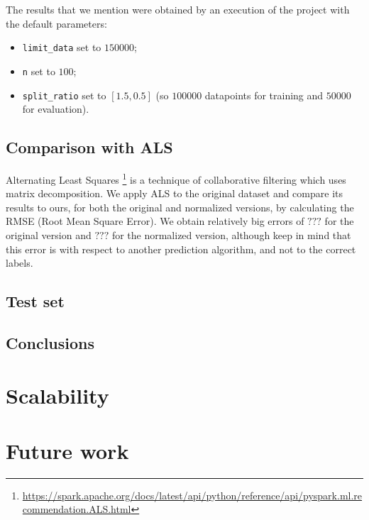 \documentclass[11pt,a4paper]{article}
\newcommand{\code}{\texttt}
\begin{document}
\begin{multicols}{2}
The results that we mention were obtained by an execution of the project with the default parameters:
\begin{itemize}
	\item \code{limit\_data} set to $150 000$;
	\item \code{n} set to $100$;
	\item \code{split\_ratio} set to $[1.5, 0.5]$ (so $100 000$ datapoints for training and $50 000$ for evaluation).
\end{itemize}


\subsection{Comparison with ALS}
Alternating Least Squares \footnote{\url{https://spark.apache.org/docs/latest/api/python/reference/api/pyspark.ml.recommendation.ALS.html}} is a technique of collaborative filtering which uses matrix decomposition.
We apply ALS to the original dataset and compare its results to ours, for both the original and normalized versions, by calculating the RMSE (Root Mean Square Error).
We obtain relatively big errors of $???$ for the original version and $???$ for the normalized version, although keep in mind that this error is with respect to another prediction algorithm, and not to the correct labels.


\subsection{Test set}


\subsection{Conclusions}



\label{scalability}
\section{Scalability}



\label{futurework}
\section{Future work}


\end{multicols}
\end{document}
